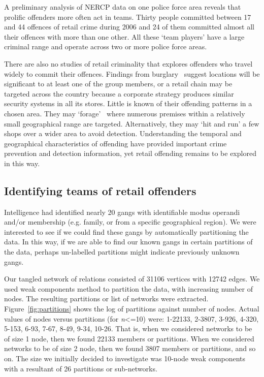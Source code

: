 \documentclass[conference]{IEEEtran}
\theoremstyle{definition}
\begin{document}
A preliminary analysis of NERCP data on one police force area reveals
that prolific offenders more often act in teams. Thirty people
committed between 17 and 44 offences of retail crime during 2006 and
24 of them committed almost all their offences with more than one
other.  All these `team players' have a large criminal range and
operate across two or more police force areas.
 
There are also no studies of retail criminality that explores
offenders who travel widely to commit their offences.  Findings from
burglary~\cite{Barker2000,EwartOatley2003,EwartOatley2006} suggest
locations will be significant to at least one of the group members, or
a retail chain may be targeted across the country because a corporate
strategy produces similar security systems in all its stores.  Little
is known of their offending patterns in a chosen area.  They may
`forage’~\cite{JohnsonBowers2004} where numerous premises within a
relatively small geographical range are targeted.  Alternatively, they
may `hit and run' a few shops over a wider area to avoid
detection. Understanding the temporal and geographical characteristics
of offending have provided important crime prevention and detection
information, yet retail offending remains to be explored in this way.


\subsection{Identifying teams of retail offenders}\label{sec:identifyteams}
Intelligence had identified nearly 20 gangs with identifiable modus
operandi and/or membership (e.g. family, or from a specific
geographical region). We were interested to see if we could find these
gangs by automatically partitioning the data. In this way, if we are
able to find our known gangs in certain partitions of the data,
perhaps un-labelled partitions might indicate previously unknown
gangs.

Our tangled network of relations consisted of 31106 vertices with
12742 edges. We used weak components method to partition the data,
with increasing number of nodes. The resulting partitions or list of
networks were extracted. Figure~\ref{fig:partitions} shows the log of
partitions against number of nodes. Actual values of nodes versus
partitions (for \emph{n}<=10) were: 1-22133, 2-3807, 3-926, 4-320,
5-153, 6-93, 7-67, 8-49, 9-34, 10-26. That is, when we considered
networks to be of size 1 node, then we found 22133 members or
partitions. When we considered networks to be of size 2 node, then we
found 3807 members or partitions, and so on. The size we initially
decided to investigate was 10-node weak components with a resultant of
26 partitions or sub-networks.
\end{document}
